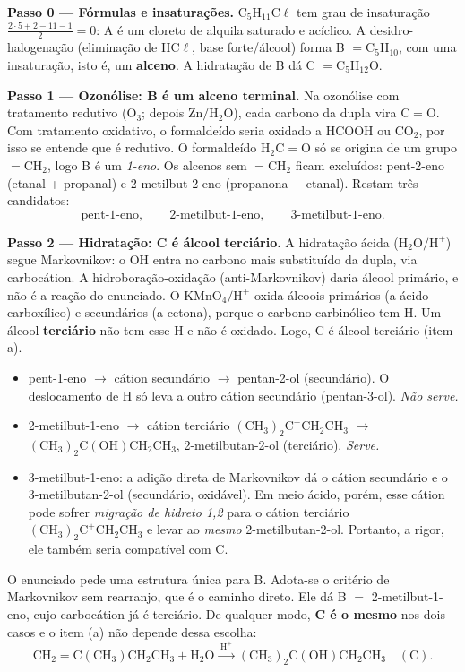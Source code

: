 \documentclass{article}%
\begin{document}
\textbf{Passo 0 --- Fórmulas e insaturações.}
$\mathrm{C_5H_{11}C\ell}$ tem grau de insaturação $\frac{2\cdot 5+2-11-1}{2}=0$: A é um cloreto de alquila saturado e acíclico. A desidro-halogenação (eliminação de $\mathrm{HC\ell}$, base forte/álcool) forma B $=\mathrm{C_5H_{10}}$, com uma insaturação, isto é, um \textbf{alceno}. A hidratação de B dá C $=\mathrm{C_5H_{12}O}$.

\textbf{Passo 1 --- Ozonólise: B é um alceno terminal.}
Na ozonólise com tratamento redutivo ($\mathrm{O_3}$; depois $\mathrm{Zn/H_2O}$), cada carbono da dupla vira $\mathrm{C{=}O}$. Com tratamento oxidativo, o formaldeído seria oxidado a $\mathrm{HCOOH}$ ou $\mathrm{CO_2}$, por isso se entende que é redutivo. O formaldeído $\mathrm{H_2C{=}O}$ só se origina de um grupo $\mathrm{=CH_2}$, logo B é um \emph{1-eno}. Os alcenos sem $\mathrm{=CH_2}$ ficam excluídos: pent-2-eno (etanal + propanal) e 2-metilbut-2-eno (propanona + etanal). Restam três candidatos:
\[
\text{pent-1-eno},\qquad \text{2-metilbut-1-eno},\qquad \text{3-metilbut-1-eno}.
\]

\textbf{Passo 2 --- Hidratação: C é álcool terciário.}
A hidratação ácida ($\mathrm{H_2O/H^+}$) segue Markovnikov: o $\mathrm{OH}$ entra no carbono mais substituído da dupla, via carbocátion. A hidroboração-oxidação (anti-Markovnikov) daria álcool primário, e não é a reação do enunciado. O $\mathrm{KMnO_4/H^+}$ oxida álcoois primários (a ácido carboxílico) e secundários (a cetona), porque o carbono carbinólico tem H. Um álcool \textbf{terciário} não tem esse H e não é oxidado. Logo, C é álcool terciário (item a).

\begin{itemize}
\item pent-1-eno $\to$ cátion secundário $\to$ pentan-2-ol (secundário). O deslocamento de H só leva a outro cátion secundário (pentan-3-ol). \emph{Não serve.}
\item 2-metilbut-1-eno $\to$ cátion terciário $\mathrm{(CH_3)_2C^+CH_2CH_3}$ $\to$ $\mathrm{(CH_3)_2C(OH)CH_2CH_3}$, 2-metilbutan-2-ol (terciário). \emph{Serve.}
\item 3-metilbut-1-eno: a adição direta de Markovnikov dá o cátion secundário e o 3-metilbutan-2-ol (secundário, oxidável). Em meio ácido, porém, esse cátion pode sofrer \emph{migração de hidreto 1,2} para o cátion terciário $\mathrm{(CH_3)_2C^+CH_2CH_3}$ e levar ao \emph{mesmo} 2-metilbutan-2-ol. Portanto, a rigor, ele também seria compatível com C.
\end{itemize}
O enunciado pede uma estrutura única para B. Adota-se o critério de Markovnikov sem rearranjo, que é o caminho direto. Ele dá B $=$ 2-metilbut-1-eno, cujo carbocátion já é terciário. De qualquer modo, \textbf{C é o mesmo} nos dois casos e o item (a) não depende dessa escolha:
\[
\mathrm{CH_2{=}C(CH_3)CH_2CH_3 + H_2O \xrightarrow{\;H^+\;} (CH_3)_2C(OH)CH_2CH_3}\quad(\text{C}).
\]
\end{document}

